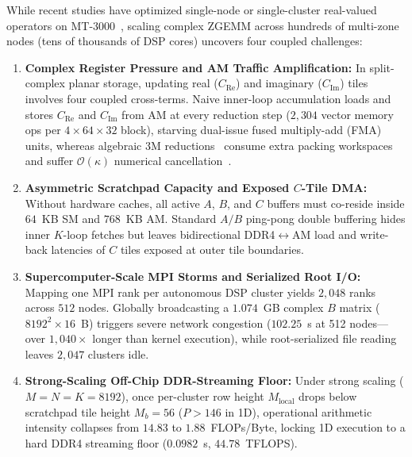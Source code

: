 \documentclass[journal]{IEEEtran}
\begin{document}
While recent studies have optimized single-node or single-cluster real-valued operators on MT-3000~\cite{fang2026mtgemm, mo2024irregular, qi2025constraint, qi2026attention}, scaling complex ZGEMM across hundreds of multi-zone nodes (tens of thousands of DSP cores) uncovers four coupled challenges:
\begin{enumerate}\setlength{\itemsep}{0.5pt}\setlength{\parskip}{0pt}
    \item \textbf{Complex Register Pressure and AM Traffic Amplification:} In split-complex planar storage, updating real ($C_{\mathrm{Re}}$) and imaginary ($C_{\mathrm{Im}}$) tiles involves four coupled cross-terms. Naive inner-loop accumulation loads and stores $C_{\mathrm{Re}}$ and $C_{\mathrm{Im}}$ from AM at every reduction step ($2{,}304$ vector memory ops per $4 \times 64 \times 32$ block), starving dual-issue fused multiply-add (FMA) units, whereas algebraic 3M reductions~\cite{vanzee2017complex} consume extra packing workspaces and suffer $\mathcal{O}(\kappa)$ numerical cancellation~\cite{higham2002accuracy}.
    \item \textbf{Asymmetric Scratchpad Capacity and Exposed $C$-Tile DMA:} Without hardware caches, all active $A$, $B$, and $C$ buffers must co-reside inside $64$~KB SM and $768$~KB AM. Standard $A/B$ ping-pong double buffering hides inner $K$-loop fetches but leaves bidirectional DDR4$\leftrightarrow$AM load and write-back latencies of $C$ tiles exposed at outer tile boundaries.
    \item \textbf{Supercomputer-Scale MPI Storms and Serialized Root I/O:} Mapping one MPI rank per autonomous DSP cluster yields $2{,}048$ ranks across $512$ nodes. Globally broadcasting a $1.074$~GB complex $B$ matrix ($8192^2 \times 16$~B) triggers severe network congestion ($102.25$~s at 512 nodes---over $1{,}040\times$ longer than kernel execution), while root-serialized file reading leaves $2{,}047$ clusters idle.
    \item \textbf{Strong-Scaling Off-Chip DDR-Streaming Floor:} Under strong scaling ($M\!=\!N\!=\!K\!=\!8192$), once per-cluster row height $M_{\mathrm{local}}$ drops below scratchpad tile height $M_b = 56$ ($P > 146$ in 1D), operational arithmetic intensity collapses from $14.83$ to $1.88$~FLOPs/Byte, locking 1D execution to a hard DDR4 streaming floor ($0.0982$~s, $44.78$~TFLOPS).
\end{enumerate}
\end{document}
